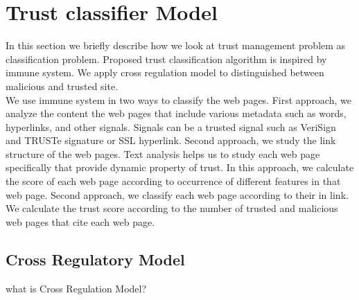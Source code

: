 \documentclass{llncs}
\begin{document}
\section{Trust classifier Model }
In this section we briefly describe how we look at trust management problem as classification problem. Proposed trust classification algorithm is inspired by immune system. We apply cross regulation model \cite{carneiro} to distinguished between malicious and trusted site.\\
We use immune system in two ways to classify the web pages. First approach, we analyze the content the web pages that include various metadata such as words, hyperlinks, and other signals. Signals can be a trusted signal such as VeriSign and TRUSTe signature or SSL hyperlink. Second approach, we study the link structure of the web pages.  Text analysis helps us to study each web page specifically that provide dynamic property of trust. In this approach, we calculate the score of each web page according to occurrence of different features in that web page. Second approach, we classify each web page according to their in link. We calculate the trust score according to the number of trusted and malicious web pages that cite each web page.\\

\subsection{Cross Regulatory Model}
what is Cross Regulation Model?
\end{document}
